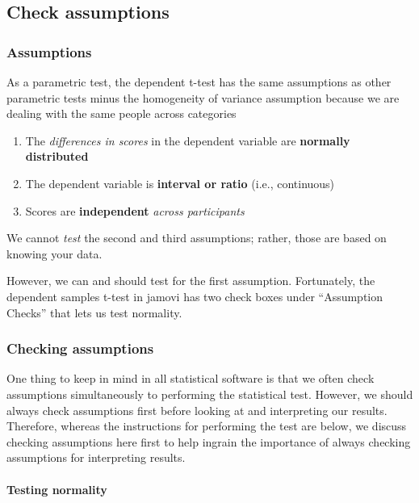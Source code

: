 \documentclass[
]{book}
\begin{document}
\hypertarget{check-assumptions-2}{%
\subsection{Check assumptions}\label{check-assumptions-2}}

\hypertarget{assumptions-2}{%
\subsubsection{Assumptions}\label{assumptions-2}}

As a parametric test, the dependent t-test has the same assumptions as other parametric tests minus the homogeneity of variance assumption because we are dealing with the same people across categories

\begin{enumerate}
\def\labelenumi{\arabic{enumi}.}
\item
  The \emph{differences in scores} in the dependent variable are \textbf{normally distributed}
\item
  The dependent variable is \textbf{interval or ratio} (i.e., continuous)
\item
  Scores are \textbf{independent} \emph{across participants}
\end{enumerate}

We cannot \emph{test} the second and third assumptions; rather, those are based on knowing your data.

However, we can and should test for the first assumption. Fortunately, the dependent samples t-test in jamovi has two check boxes under ``Assumption Checks'' that lets us test normality.

\hypertarget{checking-assumptions-3}{%
\subsubsection{Checking assumptions}\label{checking-assumptions-3}}

One thing to keep in mind in all statistical software is that we often check assumptions simultaneously to performing the statistical test. However, we should always check assumptions first before looking at and interpreting our results. Therefore, whereas the instructions for performing the test are below, we discuss checking assumptions here first to help ingrain the importance of always checking assumptions for interpreting results.

\hypertarget{testing-normality-2}{%
\paragraph{Testing normality}\label{testing-normality-2}}
\end{document}
